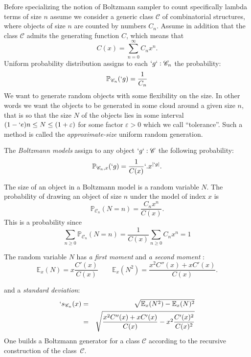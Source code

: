 \documentclass{sig-alternate}
\newcommand{\C}{\mathscr{C}}
\newcommand{\PP}{\mathbb{P}}
\newcommand{\Me}{\mathbb{E}}
\begin{document}
Before specializing the notion of Boltzmann sampler to count specifically lambda
terms of size $n$ assume we consider a generic class $\C$ of combinatorial
structures, where objects of size $n$ are counted by numbers $C_n$.  Assume in
addition that the  class $\C$ admits the generating function $C$, which means that
\begin{displaymath}
  C(x) = \sum_{n=0}^{\infty} C_n x^n.
\end{displaymath}
Uniform probability distribution assigns to each $`g`:\C_n$ the probability:
\[\PP_{\C_n}(`g) = \frac{1}{C_n}\]
We want to generate random objects with some flexibility on the size. In other words
we want the objects to be generated in some cloud around a given size $n$, that is so
that the size $N$ of the objects lies in some interval $(1-`e)n \le N \le
(1+\varepsilon)$ for some factor $\varepsilon>0$ which we call ``tolerance''. Such a
method is called the \emph{approximate-size} uniform random generation.

The \textit{Boltzmann models} assign to any object $`g`:\C$ the following
probability:
\begin{displaymath}
  \PP_{\C_n,x}(`g) = \frac{1}{C(x)}`. x^{|`g|}.
\end{displaymath}

The size of an object in a Boltzmann model is a random variable $N$.  The probability
of drawing an object of size $n$ under the model of index $x$ is
\begin{displaymath}
  \PP_{\C_n}(N=n) = \frac{C_n x^n}{C(x)}.
\end{displaymath}
This is a probability since
\begin{displaymath}
  \sum_{n\ge0} \PP_{\C_n}(N=n) = \frac{1}{C(x)}\sum_{n\ge 0} C_n x^n = 1
\end{displaymath}

The random variable $N$ has \emph{a first moment} and \emph{a second moment}
\cite{DBLP:journals/cpc/DuchonFLS04}:
\begin{displaymath}
  \Me_x(N) = x\frac{C'(x)}{C(x)} \qquad \Me_x(N^2) = \frac{x^2 C''(x) + x C'(x)}{C(x)}.
\end{displaymath}

and a \emph{standard deviation}:
\begin{eqnarray*}
  `s_{\C_n}(x) &=& \sqrt{\Me_x(N^2) - \Me_x(N)^2} \\
  &=& \sqrt{\frac{x^2 C''(x) + x
      C'(x)}{C(x)} - x^2\frac{C'(x)^2}{C(x)^2}}
\end{eqnarray*}
One builds a Boltzmann generator for a class $\C$ according to the recursive
construction of the class~$\C$.
\end{document}
